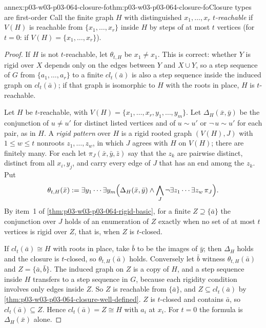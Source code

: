 \begin{annexitem}{annex:p03-w03-p03-064-closure-fo}{thm:p03-w03-p03-064-closure-fo}{Closure types are first-order}
Call the finite graph \(H\) with distinguished \(x_1,\ldots,x_r\)
\emph{\(t\)-reachable} if \(V(H)\) is reachable from \(\{x_1,\ldots,x_r\}\)
inside \(H\) by steps of at most \(t\) vertices (for \(t=0\): if
\(V(H)=\{x_1,\ldots,x_r\}\)).
\begin{proof}
If \(H\) is not \(t\)-reachable, let \(\theta_{t,H}\) be \(x_1\neq x_1\).  This
is correct: whether \(Y\) is rigid over \(X\) depends only on the edges
between \(Y\) and \(X\cup Y\), so a step sequence of \(G\) from
\(\{a_1,\ldots,a_r\}\) to a finite \(cl_t(\bar a)\) is also a step sequence
inside the induced graph on \(cl_t(\bar a)\); if that graph is isomorphic to
\(H\) with the roots in place, \(H\) is \(t\)-reachable.

Let \(H\) be \(t\)-reachable, with \(V(H)=\{x_1,\ldots,x_r,y_1,\ldots,
y_m\}\).  Let \(\Delta_H(\bar x,\bar y)\) be the conjunction of
\(u\neq u'\) for distinct listed vertices and of \(u\sim u'\) or
\(\neg\,u\sim u'\) for each pair, as in \(H\).  A \emph{rigid pattern} over
\(H\) is a rigid rooted graph \((V(H),J)\) with \(1\leq w\leq t\) nonroots
\(z_1,\ldots,z_w\), in which \(J\) agrees with \(H\) on \(V(H)\); there are
finitely many.  For each let \(\pi_J(\bar x,\bar y,\bar z)\) say that the
\(z_k\) are pairwise distinct, distinct from all \(x_i,y_j\), and carry
every edge of \(J\) that has an end among the \(z_k\).  Put
\[
  \theta_{t,H}(\bar x):=\exists y_1\cdots\exists y_m\Bigl(\Delta_H(\bar x,
  \bar y)\wedge\bigwedge_J\neg\exists z_1\cdots\exists z_w\,\pi_J\Bigr).
\]
By item~1 of \cref{thm:p03-w03-p03-064-rigid-basic}, for a finite
\(Z\supseteq\{\bar a\}\) the conjunction over \(J\) holds of an enumeration
of \(Z\) exactly when no set of at most \(t\) vertices is rigid over \(Z\),
that is, when \(Z\) is \(t\)-closed.

If \(cl_t(\bar a)\cong H\) with roots in place, take \(\bar b\) to be the
images of \(\bar y\); then \(\Delta_H\) holds and the closure is
\(t\)-closed, so \(\theta_{t,H}(\bar a)\) holds.  Conversely let
\(\bar b\) witness \(\theta_{t,H}(\bar a)\) and \(Z=\{\bar a,\bar b\}\).  The
induced graph on \(Z\) is a copy of \(H\), and a step sequence inside \(H\)
transfers to a step sequence in \(G\), because each rigidity condition
involves only edges inside \(Z\).  So \(Z\) is reachable from
\(\{\bar a\}\), and \(Z\subseteq cl_t(\bar a)\) by
\cref{thm:p03-w03-p03-064-closure-well-defined}.  \(Z\) is \(t\)-closed and
contains \(\bar a\), so \(cl_t(\bar a)\subseteq Z\).  Hence
\(cl_t(\bar a)=Z\cong H\) with \(a_i\) at \(x_i\).  For \(t=0\) the formula is
\(\Delta_H(\bar x)\) alone.
\end{proof}
\end{annexitem}

